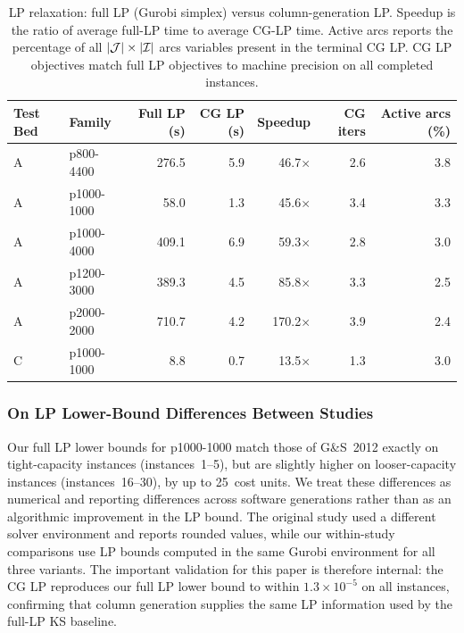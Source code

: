 \begin{table}[htbp]
\centering
\caption{LP relaxation: full LP (Gurobi simplex) versus column-generation LP.
         Speedup is the ratio of average full-LP time to average CG-LP time.
         Active arcs reports the percentage of all $|\mathcal{J}|\times|\mathcal{I}|$ arcs
         variables present in the terminal CG LP.
         CG LP objectives match full LP objectives to machine precision on all
         completed instances.}
\label{tab:lp_bottleneck}
\footnotesize
\setlength{\tabcolsep}{3pt}
\begin{tabular}{llrrrrr}
\toprule
Test Bed & Family & Full LP (s) & CG LP (s) & Speedup & CG iters & Active arcs (\%) \\
\midrule
A & p800-4400  & 276.5 & 5.9 & 46.7$\times$  & 2.6 & 3.8 \\
A & p1000-1000 &  58.0 & 1.3 & 45.6$\times$  & 3.4 & 3.3 \\
A & p1000-4000 & 409.1 & 6.9 & 59.3$\times$  & 2.8 & 3.0 \\
A & p1200-3000 & 389.3 & 4.5 & 85.8$\times$  & 3.3 & 2.5 \\
A & p2000-2000 & 710.7 & 4.2 & 170.2$\times$ & 3.9 & 2.4 \\
\midrule
C & p1000-1000 &   8.8 & 0.7 & 13.5$\times$  & 1.3 & 3.0 \\
\bottomrule
\end{tabular}
\end{table}

\subsubsection{On LP Lower-Bound Differences Between Studies}
\label{sec:lp_bounds}

Our full LP lower bounds for p1000-1000 match those of G\&S~2012 exactly on
tight-capacity instances (instances~1--5), but are slightly higher on
looser-capacity instances (instances~16--30), by up to 25~cost units.
We treat these differences as numerical and reporting differences across
software generations rather than as an algorithmic improvement in the LP bound.
The original study used a different solver environment and reports rounded
values, while our within-study comparisons use LP bounds computed in the same
Gurobi environment for all three variants.
The important validation for this paper is therefore internal: the CG LP
reproduces our full LP lower bound to within $1.3 \times 10^{-5}$ on all
instances, confirming that column generation supplies the same LP information
used by the full-LP KS baseline.

